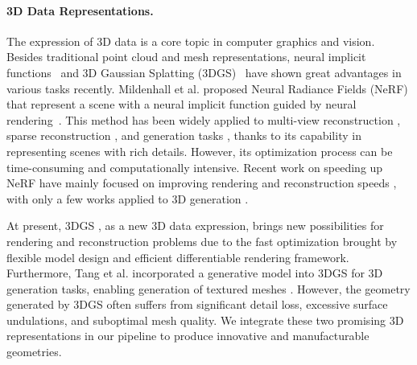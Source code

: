 \paragraph{3D Data Representations.} The expression of 3D data is a core topic in computer graphics and vision. Besides traditional point cloud and mesh representations, neural implicit functions~\cite{MON*19,PFS*19,WLL*21,MST*21} and 3D Gaussian Splatting (3DGS)~\cite{3DGauss} have shown great advantages in various tasks recently. 
Mildenhall et al. proposed Neural Radiance Fields (NeRF) that represent a scene with a neural implicit function guided by neural rendering~\cite{MST*21}. This method has been widely applied to multi-view reconstruction \cite{WLL*21,neus2,li2023neuralangelo}, sparse reconstruction \cite{Niemeyer2021Regnerf,yu2020pixelnerf,Jain_2021_ICCV,wynn-2023-diffusionerf,liu2023zero1to3}, and generation tasks \cite{jain2021dreamfields,poole2022dreamfusion,wang2023prolificdreamer,lin2023magic3d,chen2023fantasia3d,MAkeit3D}, thanks to its capability in representing scenes with rich details. However, its optimization process can be time-consuming and computationally intensive. Recent work on speeding up NeRF have mainly focused on improving rendering  \cite{kilonerf,hedman2021snerg,merf,Instant3D} and reconstruction speeds \cite{neus2,li2023neuralangelo}, with only a few works applied to 3D generation \cite{instant3d2023}.

At present, 3DGS \cite{3DGauss}, as a new 3D data expression, brings new possibilities for rendering \cite{Yu2023MipSplatting,mssplatting,scaffoldgs} and reconstruction problems \cite{dynamicgs,CFGS,zhu2023FSGS,guedon2023sugar} due to the fast optimization brought by flexible model design and efficient differentiable rendering framework. Furthermore, Tang et al. incorporated a generative model into 3DGS for 3D generation tasks, enabling generation of textured meshes \cite{tang2023dreamgaussian}. However, the geometry generated by 3DGS often suffers from significant detail loss, excessive surface undulations, and suboptimal mesh quality. We integrate these two promising 3D representations in our pipeline to produce innovative and manufacturable geometries.


